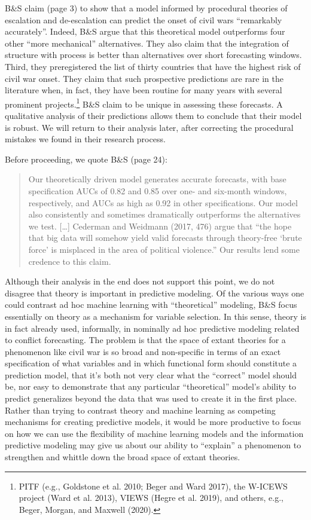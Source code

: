 \documentclass[
]{article}
\begin{document}
B\&S claim (page 3) to show that a model informed by procedural theories of escalation and de-escalation can predict the onset of civil wars ``remarkably accurately''. Indeed, B\&S argue that this theoretical model outperforms four other ``more mechanical'' alternatives. They also claim that the integration of structure with process is better than alternatives over short forecasting windows. Third, they preregistered the list of thirty countries that have the highest risk of civil war onset. They claim that such prospective predictions are rare in the literature when, in fact, they have been routine for many years with several prominent projects.\footnote{PITF (e.g., Goldstone et al. 2010; Beger and Ward 2017), the W-ICEWS project (Ward et al. 2013), VIEWS (Hegre et al. 2019), and others, e.g., Beger, Morgan, and Maxwell (2020).} B\&S claim to be unique in assessing these forecasts. A qualitative analysis of their predictions allows them to conclude that their model is robust. We will return to their analysis later, after correcting the procedural mistakes we found in their research process.

Before proceeding, we quote B\&S (page 24):

\begin{quote}
Our theoretically driven model generates accurate forecasts, with base specification AUCs of 0.82 and 0.85 over one- and six-month windows, respectively, and AUCs as high as 0.92 in other specifications. Our model also consistently and sometimes dramatically outperforms the alternatives we test. {[}\ldots{]} Cederman and Weidmann (2017, 476) argue that ``the hope that big data will somehow yield valid forecasts through theory-free `brute force' is misplaced in the area of political violence.'' Our results lend some credence to this claim.
\end{quote}

Although their analysis in the end does not support this point, we do not disagree that theory is important in predictive modeling. Of the various ways one could contrast ad hoc machine learning with ``theoretical'' modeling, B\&S focus essentially on theory as a mechanism for variable selection. In this sense, theory is in fact already used, informally, in nominally ad hoc predictive modeling related to conflict forecasting. The problem is that the space of extant theories for a phenomenon like civil war is so broad and non-specific in terms of an exact specification of what variables and in which functional form should constitute a prediction model, that it's both not very clear what the ``correct'' model should be, nor easy to demonstrate that any particular ``theoretical'' model's ability to predict generalizes beyond the data that was used to create it in the first place. Rather than trying to contrast theory and machine learning as competing mechanisms for creating predictive models, it would be more productive to focus on how we can use the flexibility of machine learning models and the information predictive modeling may give us about our ability to ``explain'' a phenomenon to strengthen and whittle down the broad space of extant theories.
\end{document}
